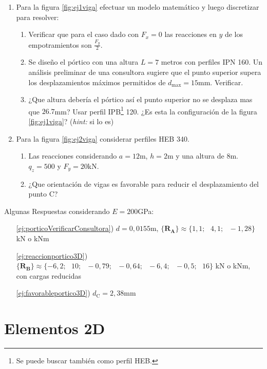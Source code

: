 \documentclass[11pt, a4paper,titlepage]{article}
\newcommand{\ms}{\ \ \ } %
\newcommand{\Cme}[1]{\boldsymbol{\{ }\mathbf{#1} \boldsymbol{\}} }
\let\oldpart\part
\renewcommand{\part}[1]{\clearpage \oldpart{#1}}
\begin{document}
\begin{enumerate}
	\item Para la figura \ref{fig:ej1viga} efectuar un modelo matemático y luego discretizar para resolver:
	\begin{enumerate}
		\item Verificar que para el caso dado con $F_x=0$ las reacciones en $y$ de los empotramientos son $\frac{F_y}{2}$.
		\item Se diseño el pórtico con una altura $L=7$ metros con perfiles IPN 160. Un análisis preliminar de una consultora sugiere que el punto superior supera los desplazamientos máximos permitidos de $d_{\max}=15$mm. Verificar.\label{ej:porticoVerificarConsultora}
		\item ¿Que altura debería el pórtico así el punto superior no se desplaza mas que $26.7$mm? Usar perfil IPB\footnote{Se puede buscar también como perfil HEB.} 120. ¿Es esta la configuración de la figura \ref{fig:ej1viga}? (\textit{hint:} si lo es)\label{ej:probvigaaltura}
	\end{enumerate}
	\item Para la figura \ref{fig:ej2viga} considerar perfiles HEB 340. 
	\begin{enumerate}
		\item Las reacciones considerando $a=12$m, $h=2$m  y una altura de $8$m. $q_z=500$ y $F_y=20$kN. \label{ej:reaccionportico3D}
		\item ¿Que orientación de vigas es favorable para reducir el desplazamiento del punto C?\label{ej:favorableportico3D} 
	\end{enumerate}
\end{enumerate}
Algunas Respuestas considerando $E=200$GPa:
\begin{itemize}
	\item[\ref{ej:porticoVerificarConsultora})]$d=0,0155$m, $\Cme{R_A}\approx\{1,1;\ms4,1;\ms-1,28\}$ kN o kNm
	
	\item[\ref{ej:reaccionportico3D})] $\Cme{R_B}\approx
	\{-6,2;\ms    10;\ms   -0,79;\ms   -0,64;\ms   -6,4;\ms   -0,5;\ms   16\}$ kN o kNm, con cargas reducidas
	
	\item[\ref{ej:favorableportico3D})] $d_{\mathrm{C}}=2,38$mm
	
\end{itemize}
\clearpage
\part{Elementos 2D}
\end{document}
